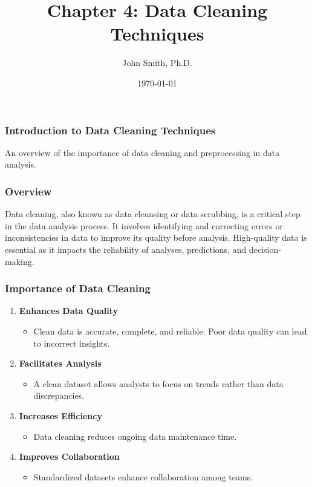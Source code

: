 \documentclass[aspectratio=169]{beamer}
\title[Data Cleaning Techniques]{Chapter 4: Data Cleaning Techniques}
\author[J. Smith]{John Smith, Ph.D.}
\institute[University Name]{
  Department of Computer Science\\
  University Name\\
  \vspace{0.3cm}
  Email: email@university.edu\\
  Website: www.university.edu
}
\date{\today}
\begin{document}
\frame{\titlepage}

\begin{frame}[fragile]
    \frametitle{Introduction to Data Cleaning Techniques}
    An overview of the importance of data cleaning and preprocessing in data analysis.
\end{frame}

\begin{frame}[fragile]
    \frametitle{Overview}
    Data cleaning, also known as data cleansing or data scrubbing, is a critical step in the data analysis process. 
    It involves identifying and correcting errors or inconsistencies in data to improve its quality before analysis. 
    High-quality data is essential as it impacts the reliability of analyses, predictions, and decision-making.
\end{frame}

\begin{frame}[fragile]
    \frametitle{Importance of Data Cleaning}
    \begin{enumerate}
        \item \textbf{Enhances Data Quality}
        \begin{itemize}
            \item Clean data is accurate, complete, and reliable. Poor data quality can lead to incorrect insights.
        \end{itemize}
        
        \item \textbf{Facilitates Analysis}
        \begin{itemize}
            \item A clean dataset allows analysts to focus on trends rather than data discrepancies.
        \end{itemize}
        
        \item \textbf{Increases Efficiency}
        \begin{itemize}
            \item Data cleaning reduces ongoing data maintenance time.
        \end{itemize}
        
        \item \textbf{Improves Collaboration}
        \begin{itemize}
            \item Standardized datasets enhance collaboration among teams.
        \end{itemize}
    \end{enumerate}
\end{frame}
\end{document}
